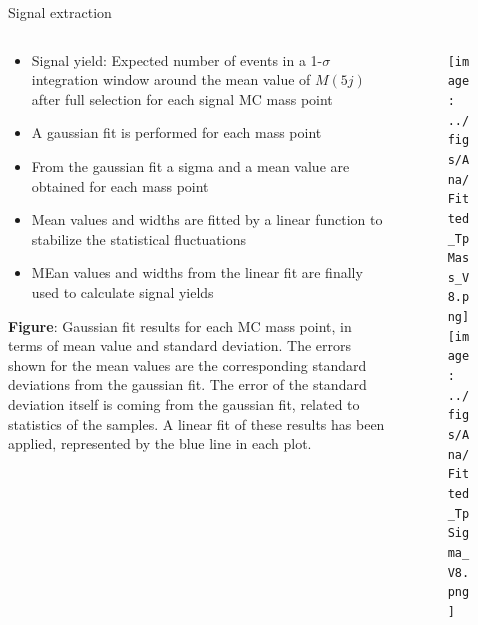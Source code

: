 \begin{frame}{Signal extraction}
\vspace{-.2cm}
\begin{columns}
\begin{column}{.40\textwidth}
   \begin{block}{}\tiny
     \begin{itemize}
     \item Signal yield: Expected number of events in a 1-$\sigma$ integration window around the mean value of $M(5j)$ after full selection for each signal MC mass point
     \item A gaussian fit is performed for each mass point
     \item From the gaussian fit a sigma and a mean value are obtained for each mass point
     \item Mean values and widths are fitted by a linear function to stabilize the statistical fluctuations
     \item MEan values and widths from the linear fit are finally used to calculate signal yields
     \end{itemize}
    \end{block}

\vspace{-.2cm}
    \begin{block}{}\tiny
      \textbf{Figure}: Gaussian fit results for each MC mass point, in terms of mean value and standard deviation. The errors shown for the mean values are the corresponding standard deviations from the gaussian fit. The error of the standard deviation itself is coming from the gaussian fit, related to statistics of the samples. A linear fit of these results has been applied, represented by the blue line in each plot.
    \end{block}
\end{column}

\begin{column}{.60\textwidth}
\begin{figure}[!Hhtbp]
  \begin{center}
    \texttt{[image: ../figs/Ana/Fitted\_TpMass\_V8.png]}
    \texttt{[image: ../figs/Ana/Fitted\_TpSigma\_V8.png]}
  \end{center}
\end{figure}


\end{column}
\end{columns}
\end{frame}
